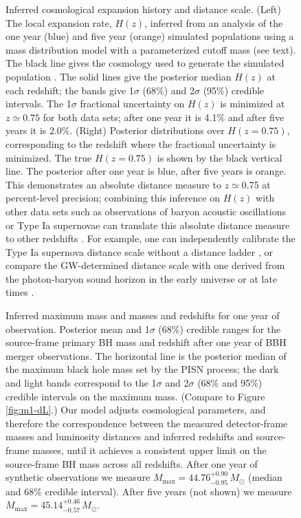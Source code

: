 \documentclass[modern]{aastex62}
\newcommand{\MMax}{M_\mathrm{max}}
\newcommand{\MMaxOneYear}{44.76^{+0.90}_{-0.95} \, \MSun{}}
\newcommand{\MMaxFiveYear}{45.14^{+0.46}_{-0.57} \, \MSun{}}
\newcommand{\SigmaHPvtOneYear}{4.1\%}
\newcommand{\SigmaHPvtFiveYear}{2.0\%}
\newcommand{\zpivot}{0.75}
\newcommand{\MSun}{M_\odot}
\begin{document}
\begin{figure}
%
  \caption{\label{fig:Hz} Inferred cosmological expansion history and distance
  scale.  (Left) The local expansion rate, $H(z)$, inferred from an analysis of
  the one year (blue) and five year (orange) simulated populations using a mass
  distribution model with a parameterized cutoff mass (see text).  The black
  line gives the cosmology used to generate the simulated population \citep[TT,
  TE, EE + lowP + lensing + ext]{Planck2016}.  The solid lines give the
  posterior median $H(z)$ at each redshift; the bands give 1$\sigma$ (68\%) and
  2$\sigma$ (95\%) credible intervals.  The 1$\sigma$ fractional uncertainty on
  $H(z)$ is minimized at $z \simeq \zpivot{}$ for both data sets; after one year
  it is \SigmaHPvtOneYear{} and after five years it is \SigmaHPvtFiveYear{}.
  (Right) Posterior distributions over $H\left(z = \zpivot{}\right)$,
  corresponding to the redshift where the fractional uncertainty is minimized.
  The true $H\left( z = \zpivot{} \right)$ is shown by the black vertical line.
  The posterior after one year is blue, after five years is orange.  This
  demonstrates an absolute distance measure to $z \simeq \zpivot{}$ at
  percent-level precision; combining this inference on $H(z)$ with other data
  sets such as observations of baryon acoustic oscillations \citep{BOSS2015} or
  Type Ia supernovae \citep{Scolnic2018} can translate this absolute distance
  measure to other redshifts \citep{BOSS2015,Cuesta2015,Feeney2019}. For
  example, one can independently calibrate the Type Ia supernova distance scale
  without a distance ladder \citep{Feeney2019,Scolnic2018}, or compare the
  \ac{GW}-determined distance scale with one derived from the photon-baryon
  sound horizon \citep{Cuesta2015,Aylor2019} in the early universe
  \citep{Planck2016} or at late times \citep{BOSS2015}. }
%
\end{figure}

\begin{figure}
%
  \caption{\label{fig:mass-correction} Inferred maximum mass and masses and
  redshifts for one year of observation.  Posterior mean and 1$\sigma$ (68\%)
  credible ranges for the source-frame primary \ac{BH} mass and redshift after
  one year of \ac{BBH} merger observations.  The horizontal line is the
  posterior median of the maximum black hole mass set by the PISN process; the
  dark and light bands correspond to the 1$\sigma$ and 2$\sigma$ (68\% and 95\%)
  credible intervals on the maximum mass.  (Compare to Figure \ref{fig:m1-dL}.)
  Our model adjusts cosmological parameters, and therefore the correspondence
  between the measured detector-frame masses and luminosity distances and
  inferred redshifts and source-frame masses, until it achieves a consistent
  upper limit on the source-frame \ac{BH} mass across all redshifts.  After one
  year of synthetic observations we measure $\MMax{} = \MMaxOneYear{}$ (median
  and 68\% credible interval).  After five years (not shown) we measure $\MMax{}
  = \MMaxFiveYear{}$.}
%
\end{figure}
\end{document}
